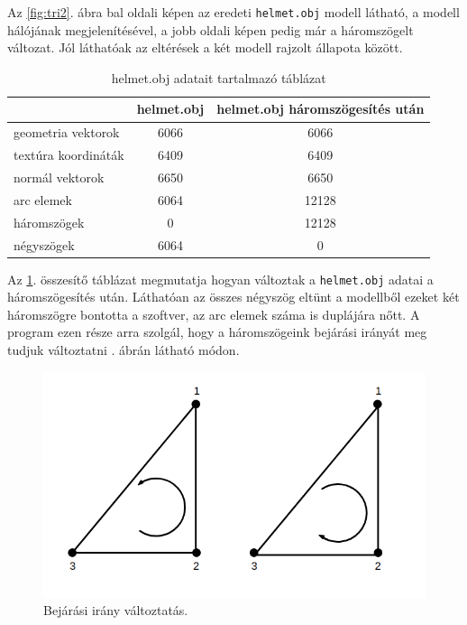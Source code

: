 Az \ref{fig:tri2}. ábra bal oldali képen az eredeti \texttt{helmet.obj} modell látható, a modell hálójának megjelenítésével, a jobb oldali képen pedig már a háromszögelt változat. Jól láthatóak az eltérések a két modell rajzolt állapota között.
\begin{table}[h]
\centering
\caption{helmet.obj adatait tartalmazó táblázat}
\bigskip
\label{tab:modellek}
\begin{tabular}{l|c|c|}
& helmet.obj & helmet.obj háromszögesítés után \\
\hline
geometria vektorok & 6066 & 6066 \\
textúra koordináták & 6409 & 6409 \\
normál vektorok & 6650 & 6650 \\
arc elemek & 6064 & 12128 \\
háromszögek & 0 & 12128 \\
négyszögek & 6064 & 0 \\
\hline
\end{tabular}
\label{fig:tri3}
\end{table}

Az \ref{fig:tri3}. összesítő táblázat megmutatja hogyan változtak a \texttt{helmet.obj} adatai a háromszögesítés után. Láthatóan az összes négyszög eltünt a modellből ezeket két háromszögre bontotta a szoftver, az arc elemek száma is duplájára nőtt.
\newpage
{}
\bigskip
A program ezen része arra szolgál, hogy a háromszögeink bejárási irányát meg tudjuk változtatni . ábrán látható módon.
\bigskip
\begin{figure}[h]
\centering
\includegraphics[scale=0.5]{images/bejarasi.png}
\caption{Bejárási irány változtatás.}
\label{fig:bej1}
\end{figure}
\bigskip

